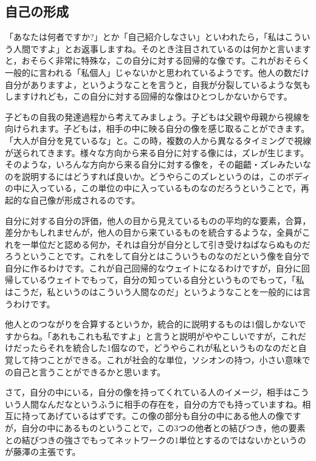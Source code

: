 \documentclass{ltjsbook}
\begin{document}
\subsection{自己の形成}

「あなたは何者ですか?」とか「自己紹介しなさい」といわれたら，「私はこういう人間ですよ」とお返事しますね。そのとき注目されているのは何かと言いますと，おそらく非常に特殊な，この自分に対する回帰的な像です。これがおそらく一般的に言われる「私個人」じゃないかと思われているようです。他人の数だけ自分がありますよ，というようなことを言うと，自我が分裂しているような気もしますけれども，この自分に対する回帰的な像はひとつしかないからです。

子どもの自我の発達過程から考えてみましょう。子どもは父親や母親から視線を向けられます。子どもは，相手の中に映る自分の像を感じ取ることができます。「大人が自分を見ているな」と。この時，複数の人から異なるタイミングで視線が送られてきます。様々な方向から来る自分に対する像には，ズレが生じます。そのような，いろんな方向から来る自分に対する像を，その齟齬・ズレみたいなのを説明するにはどうすれば良いか。どうやらこのズレというのは，このボディの中に入っている，この単位の中に入っているものなのだろうということで，再起的な自己像が形成されるのです\parencite{KimuraYoji}。

自分に対する自分の評価，他人の目から見えているものの平均的な要素，合算，差分かもしれませんが，他人の目から来ているものを統合するような，全員がこれを一単位だと認める何か，それは自分が自分として引き受けねばならぬものだろうということです。これをして自分とはこういうものなのだという像を自分で自分に作るわけです。これが自己回帰的なウェイトになるわけですが，自分に回帰しているウェイトでもって，自分の知っている自分というものでもって，「私はこうだ，私というのはこういう人間なのだ」というようなことを一般的には言うわけです。

他人とのつながりを合算するというか，統合的に説明するものは1個しかないですからね。「あれもこれも私ですよ」と言うと説明がややこしいですが，これだけだったらそれを統合した1個なので，どうやらこれが私というものなのだと自覚して持つことができる。これが社会的な単位，ソシオンの持つ，小さい意味での自己と言うことができるかと思います。

さて，自分の中にいる，自分の像を持ってくれている人のイメージ，相手はこういう人間なんだなというふうに相手の存在を，自分の方でも持っていますね。相互に持ってあげているはずです。この像の部分も自分の中にある他人の像ですが，自分の中にあるものということで，この3つの他者との結びつき，他の要素との結びつきの強さでもってネットワークの1単位とするのではないかというのが藤澤の主張です。
\end{document}
